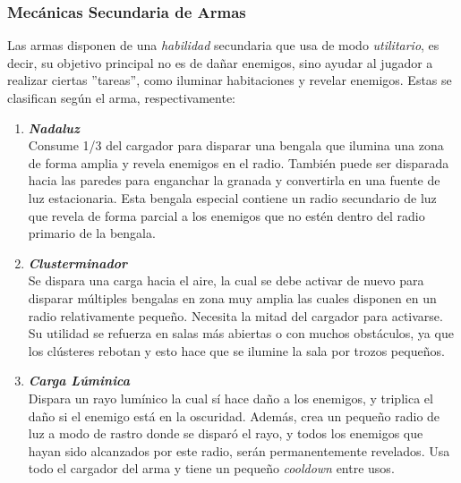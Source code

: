     \subsubsection{Mecánicas Secundaria de Armas} \label{mecanicasSecundarias}
        Las armas disponen de una \textit{habilidad} secundaria que usa de modo \textit{utilitario}, es decir, su objetivo principal no es de dañar enemigos, sino ayudar al jugador a realizar ciertas ''tareas'', como iluminar habitaciones y revelar enemigos.
        Estas se clasifican según el arma, respectivamente:
        \begin{enumerate}
            \item \textbf{\textit{Nadaluz}} \\
                Consume 1/3 del cargador para disparar una bengala que ilumina una zona de forma amplia y revela enemigos en el radio. También puede ser disparada hacia las paredes para enganchar la granada y convertirla en una fuente de luz estacionaria.
                Esta bengala especial contiene un radio secundario de luz que revela de forma parcial a los enemigos que no estén dentro del radio primario de la bengala.
            \item \textbf{\textit{Clusterminador}} \\
                Se dispara una carga hacia el aire, la cual se debe activar de nuevo para disparar múltiples bengalas en zona muy amplia las cuales disponen en un radio relativamente pequeño. Necesita la mitad del cargador para activarse.
                Su utilidad se refuerza en salas más abiertas o con muchos obstáculos, ya que los clústeres rebotan y esto hace que se ilumine la sala por trozos pequeños.
            \item \textbf{\textit{Carga Lúminica}} \\
                Dispara un rayo lumínico la cual sí hace daño a los enemigos, y triplica el daño si el enemigo está en la oscuridad. Además, crea un pequeño radio de luz a modo de rastro donde se disparó el rayo, y todos los enemigos que hayan sido alcanzados por este radio, serán permanentemente revelados.
                Usa todo el cargador del arma y tiene un pequeño \textit{cooldown} entre usos.
        \end{enumerate}

